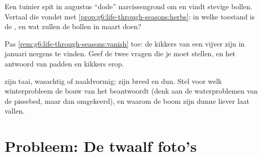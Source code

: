 \begin{exercise}[$\star\star$]\label{exo:g6:life-through-seasons:10}
Een tuinier spit in augustus ``dode'' narcissengrond om en vindt stevige
bollen. Vertaal die vondst met
\cref{prop:g6:life-through-seasons:herbs}: in welke toestand is de ,
en wat zullen de bollen in maart doen?
\end{exercise}

\begin{exercise}[$\star\star$]\label{exo:g6:life-through-seasons:11}
Pas \cref{rem:g6:life-through-seasons:vanish} toe: de kikkers van een
vijver zijn in januari nergens te vinden. Geef de twee vragen die je moet
stellen, en het antwoord van padden en kikkers erop.
\end{exercise}

\begin{exercise}[$\star\star\star$]\label{exo:g6:life-through-seasons:12}
  zijn taai, wasachtig of naaldvormig;
  zijn breed en dun. Stel voor welk winterprobleem
de bouw van het   beantwoordt (denk aan de
waterproblemen van de pissebed, maar dan omgekeerd), en waarom de
 boom zijn dunne  liever laat vallen.
\end{exercise}

\section{Probleem: De twaalf foto's}

